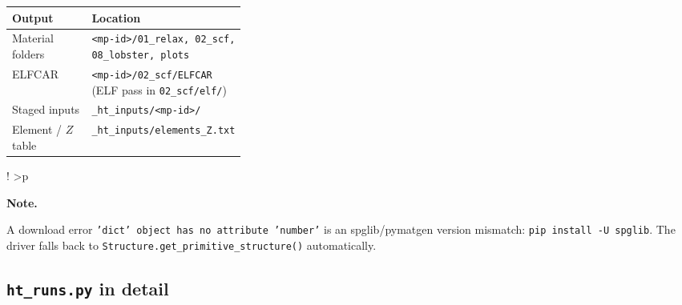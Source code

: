 \documentclass[11pt,a4paper]{scrartcl}
\newlength{\boxwidth}
\newenvironment{notebox}{%
  \par\vspace{6pt}%
  \setlength{\tabcolsep}{5pt}%
  \setlength{\boxwidth}{\dimexpr\linewidth - 4pt - 2\tabcolsep}%
  \noindent\begin{tabular}{!{\color{notebar}\vrule width 4pt}%
      >{\columncolor{notebg}}p{\boxwidth}}%
  \rule{0pt}{11pt}\textbf{\textcolor{notebar}{Note.}}\enspace\ignorespaces%
}{%
  \rule[-4pt]{0pt}{4pt}%
  \end{tabular}\par\vspace{6pt}%
}
\newcommand{\thead}{\rowcolor{lightblue}}
\begin{document}
\begin{tabularx}{\linewidth}{@{}>{\raggedright\arraybackslash}p{0.34\linewidth}X@{}}
\thead
Output & Location \\ \midrule
Material folders & \texttt{<mp-id>/01\_relax, 02\_scf, 08\_lobster, plots} \\
ELFCAR & \texttt{<mp-id>/02\_scf/ELFCAR} (ELF pass in \texttt{02\_scf/elf/}) \\
Staged inputs & \texttt{\_ht\_inputs/<mp-id>/} \\
Element / $Z$ table & \texttt{\_ht\_inputs/elements\_Z.txt} \\
\bottomrule
\end{tabularx}

\begin{notebox}
A download error \texttt{'dict' object has no attribute 'number'} is an
spglib/pymatgen version mismatch: \texttt{pip install -U spglib}.  The driver
falls back to \texttt{Structure.get\_primitive\_structure()} automatically.
\end{notebox}

\subsection{\texttt{ht\_runs.py} in detail}
\label{sec:ht-runs}
\end{document}
